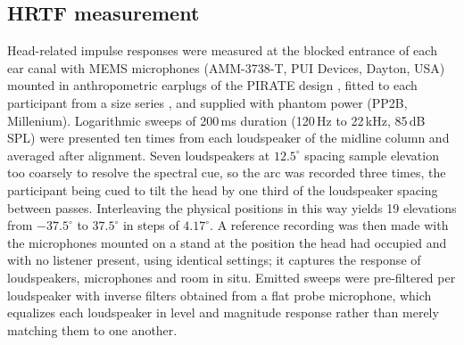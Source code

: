 
\subsection{HRTF measurement}\label{sec:hrir}

Head-related impulse responses were measured at the blocked entrance of each
ear canal with MEMS microphones (AMM-3738-T, PUI Devices, Dayton, USA) mounted
in anthropometric earplugs of the PIRATE design
, fitted to each participant from a size series
, and supplied with phantom power (PP2B, Millenium). Logarithmic sweeps of 200\,ms duration (120\,Hz to 22\,kHz, 85\,dB SPL) were
presented ten times from each loudspeaker of the midline column and averaged
after alignment. Seven loudspeakers at $12.5^\circ$ spacing sample elevation
too coarsely to resolve the spectral cue, so the arc was recorded three times,
the participant being cued to tilt the head by one third of the loudspeaker
spacing between passes. Interleaving the physical positions in this way yields
19 elevations from $-37.5^\circ$ to $37.5^\circ$ in steps of $4.17^\circ$. A reference recording was then made with the microphones mounted
on a stand at the position the head had occupied and with no listener present,
using identical settings; it captures the response of loudspeakers,
microphones and room in situ. Emitted sweeps were pre-filtered per loudspeaker
with inverse filters obtained from a flat probe microphone, which equalizes
each loudspeaker in level and magnitude response rather than merely matching
them to one another.

